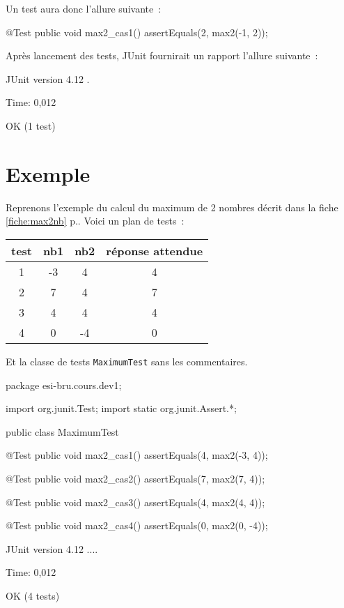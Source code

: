 Un test aura donc l'allure suivante~:

\begin{java}
@Test
public void max2_cas1(){
	assertEquals(2, max2(-1, 2));
}
\end{java}

Après lancement des tests, JUnit fournirait un rapport l'allure suivante~:

\begin{term}
JUnit version 4.12
.

Time: 0,012

OK (1 test)
\end{term}

\section{Exemple}

Reprenons l'exemple du calcul du maximum de 2 nombres décrit dans la fiche
\ref{fiche:max2nb} p.\pageref{fiche:max2nb}. Voici un plan de tests~:

\begin{center}
\begin{tabular}{|c|cc|c|}
	\hline
	\rowcolor{black!40}
	test \no & nb1 & nb2 & réponse attendue  \\
	\hline 
	1 & -3    & 4   & 4	\\\hline
	2 & 7     & 4   & 7 \\\hline
	3 & 4     & 4   & 4 \\\hline
	4 & 0     & -4  & 0 \\\hline
\end{tabular}
\end{center}		

Et la classe de tests \texttt{MaximumTest} sans les commentaires.

\begin{java}
package esi-bru.cours.dev1;

import org.junit.Test;
import static org.junit.Assert.*;

public class MaximumTest {
    
    
	@Test
	public void max2_cas1(){
		assertEquals(4, max2(-3, 4));
	}

	@Test
	public void max2_cas2(){
		assertEquals(7, max2(7, 4));
	}

	@Test
	public void max2_cas3(){
		assertEquals(4, max2(4, 4));
	}

	@Test
	public void max2_cas4(){
		assertEquals(0, max2(0, -4));
	}
}
\end{java}


\begin{term}
JUnit version 4.12
....

Time: 0,012

OK (4 tests)
\end{term}






